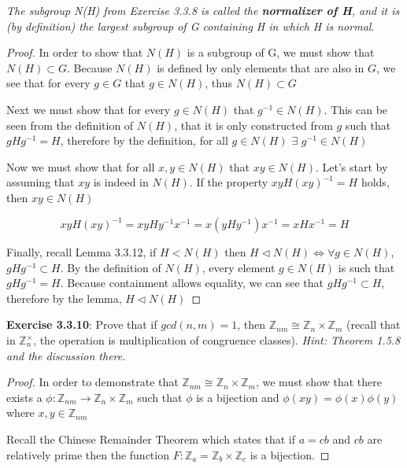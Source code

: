 \documentclass[a4paper]{article}
\begin{document}
\begin{myparindent}{0pt}
\textit{The subgroup N(H) from Exercise 3.3.8 is called the
\textbf{normalizer of H}, and it is (by definition) the largest subgroup of G
containing H in which H is normal}.
\newline

\begin{proof}
  In order to show that $N(H)$ is a subgroup of G, we must show that
  $N(H) \subset G$. Because $N(H)$ is defined by only elements that are also in
  $G$, we see that for every $g \in G$ that $g \in N(H)$, thus $N(H) \subset G$
  \newline

  Next we must show that for every $g \in N(H)$ that $g^{-1} \in N(H)$. This can
  be seen from the definition of $N(H)$, that it is only constructed from $g$
  such that $gHg^{-1} = H$, therefore by the definition, for all
  $g \in N(H)$ $\exists$ $g^{-1} \in N(H)$
  \newline

  Now we must show that for all $x, y \in N(H)$ that $xy \in N(H)$. Let's
  start by assuming that $xy$ is indeed in $N(H)$. If the property
  $x y H (x y)^{-1} = H$ holds, then $xy \in N(H)$

  \[ x y H (x y)^{-1} = xy H y^{-1} x^{-1} = x(y H y^{-1}) x^{-1} = x H x^{-1} = H \]

  Finally, recall Lemma 3.3.12, if $H < N(H)$ then
  $H \triangleleft N(H) \iff \forall g \in N(H)$, $gHg^{-1} \subset H$.
  By the definition of $N(H)$, every element $g \in N(H)$ is such that $gHg^{-1} = H$.
  Because containment allows equality, we can see that $gHg^{-1} \subset H$,
  therefore by the lemma, $H \triangleleft N(H)$
\end{proof}

\textbf{Exercise 3.3.10}:
Prove that if $gcd(n, m) = 1$, then
$\mathbb{Z}_{nm} \cong \mathbb{Z}_n \times \mathbb{Z}_m$
(recall that in $\mathbb{Z}_n^\times$, the operation is multiplication of
congruence classes). \textit{Hint: Theorem 1.5.8 and the discussion there}.
\newline

\begin{proof}
  In order to demonstrate that $\mathbb{Z}_{nm} \cong \mathbb{Z}_n \times \mathbb{Z}_m$,
  we must show that there exists a $\phi: \mathbb{Z}_{nm} \rightarrow \mathbb{Z}_n \times \mathbb{Z}_m$
  such that $\phi$ is a bijection and $\phi(xy) = \phi(x) \phi(y)$ where $x, y \in \mathbb{Z}_{nm}$ \newline

  Recall the Chinese Remainder Theorem which states that if $a = cb$ and $cb$
  are relatively prime then the function $F: \mathbb{Z}_a = \mathbb{Z}_b \times \mathbb{Z}_c$
  is a bijection. \newline


\end{proof}
\end{myparindent}
\end{document}
